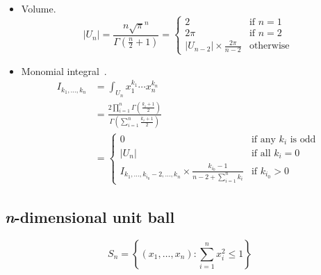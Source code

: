 \documentclass[final]{scrartcl}
\begin{document}
\begin{itemize}
  \item Volume.
\begin{equation}\label{ndimsphere}
  |U_n|
  = \frac{n \sqrt{\pi}^n}{\Gamma(\frac{n}{2}+1)}
  = \begin{cases}
    2&\text{if $n = 1$}\\
    2\pi&\text{if $n = 2$}\\
    |U_{n-2}| \times \frac{2\pi}{n - 2}&\text{otherwise}
  \end{cases}
\end{equation}

  \item Monomial integral~\cite{folland}.
\begin{align}\nonumber
  I_{k_1,\dots,k_n}
  &= \int_{U_n} x_1^{k_1}\cdots x_n^{k_n}\\
  &= \frac{2\prod_{i=1}^n
    \Gamma\left(\frac{k_i+1}{2}\right)}{\Gamma\left(\sum_{i=1}^n\frac{k_i+1}{2}\right)}\label{sphere:closed}\\
  &=\begin{cases}
    0&\text{if any $k_i$ is odd}\\
    |U_n|&\text{if all $k_i=0$}\\
    I_{k_1,\dots,k_{i_0}-2,\dots,k_n} \times \frac{k_{i_0} - 1}{n - 2 + \sum_{i=1}^n k_i}&\text{if $k_{i_0} > 0$}
  \end{cases}
\end{align}
\end{itemize}


\subsection*{\textit{n}-dimensional unit ball}
\[
  S_n = \left\{(x_1,\dots,x_n): \sum_{i=1}^n x_i^2 \le 1\right\}
\]
\end{document}
